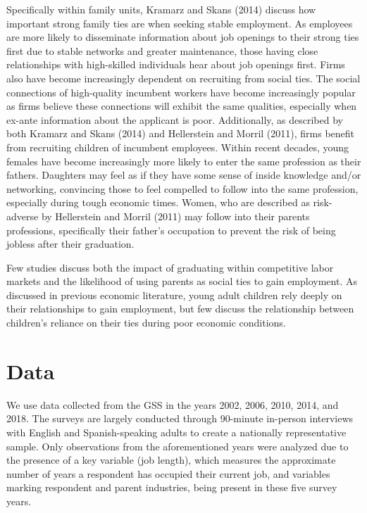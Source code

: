 \documentclass[12pt]{article}
\begin{document}
Specifically within family units, Kramarz and Skans (2014) discuss how important strong family ties are when seeking stable employment. As employees are more likely to disseminate information about job openings to their strong ties first due to stable networks and greater maintenance, those having close relationships with high-skilled individuals hear about job openings first. Firms also have become increasingly dependent on recruiting from social ties. The social connections of high-quality incumbent workers have become increasingly popular as firms believe these connections will exhibit the same qualities, especially when ex-ante information about the applicant is poor. Additionally, as described by both Kramarz and Skans (2014) and Hellerstein and Morril (2011), firms benefit from recruiting children of incumbent employees. Within recent decades, young females have become increasingly more likely to enter the same profession as their fathers. Daughters may feel as if they have some sense of inside knowledge and/or networking, convincing those to feel compelled to follow into the same profession, especially during tough economic times. Women, who are described as risk-adverse by Hellerstein and Morril (2011) may follow into their parents professions, specifically their father’s occupation to prevent the risk of being jobless after their graduation. 

Few studies discuss both the impact of graduating within competitive labor markets and the likelihood of using parents as social ties to gain employment. As discussed in previous economic literature, young adult children rely deeply on their relationships to gain employment, but few discuss the relationship between children’s reliance on their ties during poor economic conditions.


\section{Data}
\label{sec:data}
We use data collected from the GSS in the years 2002, 2006, 2010, 2014, and 2018. The surveys are largely conducted through 90-minute in-person interviews with English and Spanish-speaking adults to create a nationally representative sample. Only observations from the aforementioned years were analyzed due to the presence of a key variable (job length), which measures the approximate number of years a respondent has occupied their current job, and variables marking respondent and parent industries, being present in these five survey years. 
\end{document}
